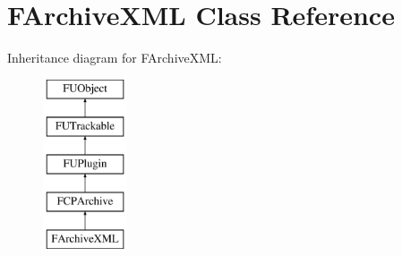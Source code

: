 \hypertarget{classFArchiveXML}{
\section{FArchiveXML Class Reference}
\label{classFArchiveXML}
}
Inheritance diagram for FArchiveXML:\begin{figure}[H]
\begin{center}
\leavevmode
\includegraphics[height=5.000000cm]{classFArchiveXML}
\end{center}
\end{figure}
